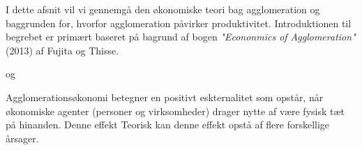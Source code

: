 
I dette afsnit vil vi gennemgå den økonomiske teori bag agglomeration og baggrunden for, hvorfor agglomeration påvirker produktivitet. Introduktionen til begrebet er primært baseret på bagrund af bogen \emph{"Econonmics of Agglomeration"} (2013) af Fujita og Thisse.

 og 

Agglomerationsøkonomi betegner en positivt eskternalitet som opstår, når økonomiske agenter (personer og virksomheder) drager nytte af være fysisk tæt på hinanden. Denne effekt Teorisk kan denne effekt opstå af flere forskellige årsager. 



